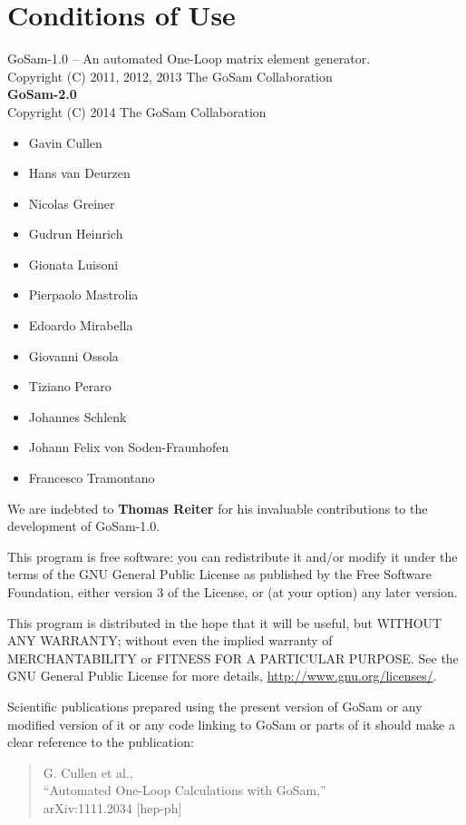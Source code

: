 \documentclass[11pt,a4paper]{refrep}
\begin{document}
\chapter*{Conditions of Use}
    GoSam-1.0 -- An automated One-Loop matrix element generator.\\
    Copyright (C) 2011, 2012, 2013  The GoSam Collaboration\\
    {\bf GoSam-2.0}  \\
    Copyright (C) 2014  The GoSam Collaboration\\
     \begin{itemize}               
                \item Gavin Cullen
		\item Hans van Deurzen
                \item Nicolas Greiner
                \item Gudrun Heinrich
                \item Gionata Luisoni
                \item Pierpaolo Mastrolia
		\item Edoardo Mirabella
                \item Giovanni Ossola
		\item Tiziano Peraro
		\item Johannes Schlenk
		\item Johann Felix von Soden-Fraunhofen
                \item Francesco Tramontano
    \end{itemize}
   
    We are indebted to {\bf Thomas Reiter} for his invaluable contributions 
    to the development of GoSam-1.0.

    This program is free software: you can redistribute it and/or modify
    it under the terms of the GNU General Public License as published by
    the Free Software Foundation, either version 3 of the License, or
    (at your option) any later version.

    This program is distributed in the hope that it will be useful,
    but WITHOUT ANY WARRANTY; without even the implied warranty of
    MERCHANTABILITY or FITNESS FOR A PARTICULAR PURPOSE.  See the
    GNU General Public License for more details, 
    \url{http://www.gnu.org/licenses/}.

   
    Scientific publications prepared using the present version of
    GoSam or any modified version of it or any code linking to
    GoSam or parts of it should make a clear reference to the publication:

    \begin{quote}
        G. Cullen et al.,\\
        ``Automated One-Loop Calculations with GoSam,''\\
        arXiv:1111.2034 [hep-ph]\\
    \end{quote}





\begin{fullpage}

\end{fullpage}

\clearpage
\remarks
\end{document}
